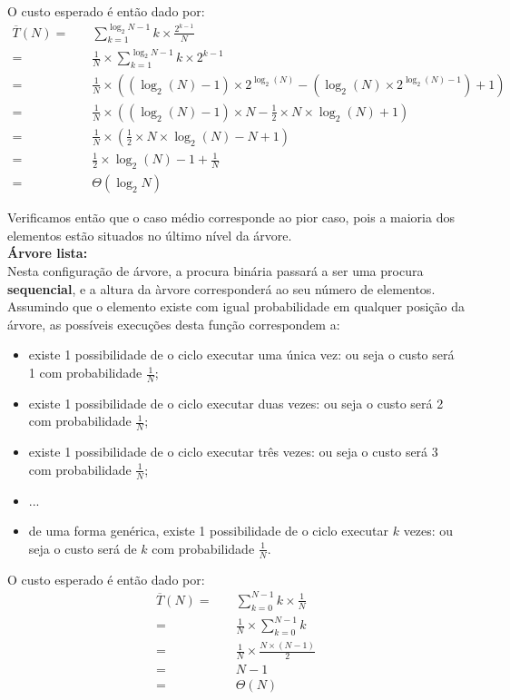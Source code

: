\documentclass[a4paper,11pt]{article}
\begin{document}
	\noindent O custo esperado é então dado por:
	\begin{align*}
		\overline{T}(N) = \quad &\sum_{k=1}^{\log_2 N-1} k \times \frac{2^{k-1}}{N}\\
		= \quad &\frac{1}{N} \times \sum_{k=1}^{\log_2 N-1} k \times 2^{k-1}\\
		= \quad &\frac{1}{N} \times ((\log_2(N) - 1) \times 2^{\log_2(N)} - (\log_2(N) \times 2^{\log_2(N)-1}) + 1)\\
		= \quad &\frac{1}{N} \times ((\log_2(N) - 1) \times N - \frac{1}{2} \times N \times \log_2(N) + 1)\\
		= \quad &\frac{1}{N} \times (\frac{1}{2} \times N \times \log_2(N) - N + 1)\\
		= \quad & \frac{1}{2} \times \log_2(N) - 1 + \frac{1}{N}\\
		= \quad &\Theta(\log_2 N)
	\end{align*}
	
	\noindent Verificamos então que o caso médio corresponde ao pior caso, pois a maioria dos elementos estão situados no último nível da árvore.\\
	
	\noindent \textbf{Árvore lista:}\\
	
	\noindent Nesta configuração de árvore, a procura binária passará a ser uma procura \textbf{sequencial}, e a altura da àrvore corresponderá ao seu número de elementos. Assumindo que o elemento existe com igual probabilidade em qualquer posição da árvore, as possíveis execuções desta função correspondem a:
	
	\begin{itemize}
		\item existe 1 possibilidade de o ciclo executar uma única vez: ou seja o custo será 1 com probabilidade $\frac{1}{N}$;
		\item existe 1 possibilidade de o ciclo executar duas vezes: ou seja o custo será 2 com probabilidade $\frac{1}{N}$;
		\item existe 1 possibilidade de o ciclo executar três vezes: ou seja o custo será 3 com probabilidade $\frac{1}{N}$;
		\item ...
		\item de uma forma genérica, existe 1 possibilidade de o ciclo executar $k$ vezes: ou seja o custo será de $k$ com probabilidade $\frac{1}{N}$.
	\end{itemize}
	
	\noindent O custo esperado é então dado por:
	\begin{align*}
		\overline{T}(N) = \quad &\sum_{k=0}^{N-1} k \times \frac{1}{N}\\
		= \quad &\frac{1}{N} \times \sum_{k=0}^{N-1} k\\
		= \quad &\frac{1}{N} \times \frac{N \times (N-1)}{2}\\
		= \quad &N-1\\
		= \quad &\Theta(N)
	\end{align*}
	
\end{document}
